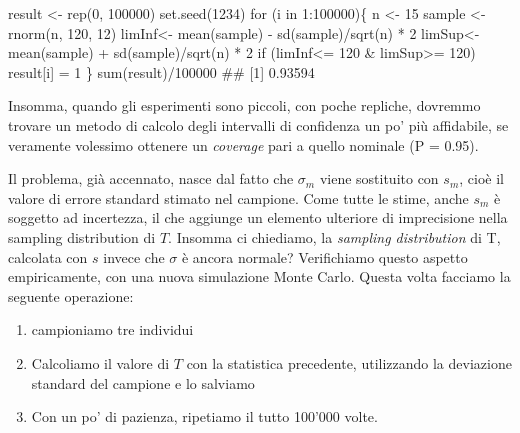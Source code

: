 \documentclass[a4paper,12pt,oneside]{book}
\providecommand{\tightlist}{%
  \setlength{\itemsep}{0pt}\setlength{\parskip}{0pt}}
\newenvironment{Shaded}{\begin{snugshade}}{\end{snugshade}}
\newcommand{\DecValTok}[1]{#1}
\newcommand{\SpecialCharTok}[1]{#1}
\newcommand{\DocumentationTok}[1]{#1}
\newcommand{\OtherTok}[1]{#1}
\newcommand{\FunctionTok}[1]{#1}
\newcommand{\ControlFlowTok}[1]{#1}
\newcommand{\NormalTok}[1]{#1}
\begin{document}
\begin{Shaded}
\begin{Highlighting}[]
\NormalTok{result }\OtherTok{\textless{}{-}} \FunctionTok{rep}\NormalTok{(}\DecValTok{0}\NormalTok{, }\DecValTok{100000}\NormalTok{)}
\FunctionTok{set.seed}\NormalTok{(}\DecValTok{1234}\NormalTok{)}
\ControlFlowTok{for}\NormalTok{ (i }\ControlFlowTok{in} \DecValTok{1}\SpecialCharTok{:}\DecValTok{100000}\NormalTok{)\{}
\NormalTok{  n }\OtherTok{\textless{}{-}} \DecValTok{15}
\NormalTok{  sample }\OtherTok{\textless{}{-}} \FunctionTok{rnorm}\NormalTok{(n, }\DecValTok{120}\NormalTok{, }\DecValTok{12}\NormalTok{)}
\NormalTok{  limInf}\OtherTok{\textless{}{-}} \FunctionTok{mean}\NormalTok{(sample) }\SpecialCharTok{{-}} \FunctionTok{sd}\NormalTok{(sample)}\SpecialCharTok{/}\FunctionTok{sqrt}\NormalTok{(n) }\SpecialCharTok{*} \DecValTok{2} 
\NormalTok{  limSup}\OtherTok{\textless{}{-}} \FunctionTok{mean}\NormalTok{(sample) }\SpecialCharTok{+} \FunctionTok{sd}\NormalTok{(sample)}\SpecialCharTok{/}\FunctionTok{sqrt}\NormalTok{(n) }\SpecialCharTok{*} \DecValTok{2}
  \ControlFlowTok{if}\NormalTok{ (limInf}\SpecialCharTok{\textless{}=} \DecValTok{120} \SpecialCharTok{\&}\NormalTok{ limSup}\SpecialCharTok{\textgreater{}=} \DecValTok{120}\NormalTok{) result[i] }\OtherTok{=} \DecValTok{1}
\NormalTok{\}}
\FunctionTok{sum}\NormalTok{(result)}\SpecialCharTok{/}\DecValTok{100000}
\DocumentationTok{\#\# [1] 0.93594}
\end{Highlighting}
\end{Shaded}

Insomma, quando gli esperimenti sono piccoli, con poche repliche, dovremmo trovare un metodo di calcolo degli intervalli di confidenza un po' più affidabile, se veramente volessimo ottenere un \emph{coverage} pari a quello nominale (P = 0.95).

Il problema, già accennato, nasce dal fatto che \(\sigma_m\) viene sostituito con \(s_m\), cioè il valore di errore standard stimato nel campione. Come tutte le stime, anche \(s_m\) è soggetto ad incertezza, il che aggiunge un elemento ulteriore di imprecisione nella sampling distribution di \(T\). Insomma ci chiediamo, la \emph{sampling distribution} di T, calcolata con \(s\) invece che \(\sigma\) è ancora normale? Verifichiamo questo aspetto empiricamente, con una nuova simulazione Monte Carlo. Questa volta facciamo la seguente operazione:

\begin{enumerate}
\def\labelenumi{\arabic{enumi}.}
\tightlist
\item
  campioniamo tre individui
\item
  Calcoliamo il valore di \(T\) con la statistica precedente, utilizzando la deviazione standard del campione e lo salviamo
\item
  Con un po' di pazienza, ripetiamo il tutto 100'000 volte.
\end{enumerate}
\end{document}
